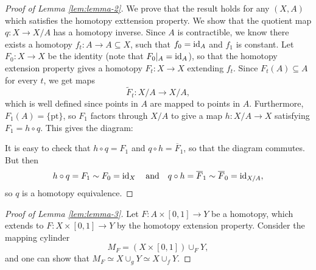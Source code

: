 \begin{proof}[Proof of Lemma \ref{lem:lemma-2}]
  We prove that the result holds for any $(X, A)$
  which satisfies the homotopy exttension property.
  We show that the quotient map $q : X \to X / A$
  has a homotopy inverse. Since $A$ is contractible,
  we know there exists a homotopy $f_t : A \to A \subseteq X$,
  such that $f_0 = \operatorname{id}_A$ and $f_1$ is constant.
  Let $F_0 : X \to X$ be the identity (note that
  $F_0|_A = \operatorname{id}_A$), so that the homotopy extension
  property gives a homotopy
  $F_t : X \to X$ extending $f_t$.
  Since $F_t(A) \subseteq A$ for every $t$, we get maps
  \[
    \widetilde{F}_t : X / A \to X / A,
  \]
  which is well defined since points in $A$ are mapped
  to points in $A$. Furthermore, $F_1(A) = \{\text{pt}\}$,
  so $F_1$ factors through $X / A$ to give a map
  $h : X / A \to X$ satisfying $F_1 = h \circ q$. This
  gives the diagram:
  \begin{center}
  \end{center}
  It is easy to check that $h \circ q = F_1$ and
  $q \circ h = \overline{F}_1$, so that the
  diagram commutes. But then
  \[
    h \circ q = F_1 \sim F_0 = \operatorname{id}_X \quad \text{and} \quad
    q \circ h = \overline{F}_1 \sim \overline{F}_0 = \operatorname{id}_{X / A},
  \]
  so $q$ is a homotopy equivalence.
\end{proof}

\begin{proof}[Proof of Lemma \ref{lem:lemma-3}]
  Let $F : A \times [0, 1] \to Y$ be a homotopy,
  which extends to $F : X \times [0, 1] \to Y$
  by the homotopy extension property. Consider
  the mapping cylinder
  \[
    M_F = (X \times [0, 1]) \cup_F Y,
  \]
  and one can show that
  $M_F \simeq X \cup_g Y \simeq X \cup_f Y$.
\end{proof}
